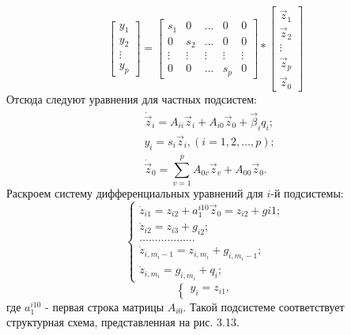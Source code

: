 \begin{equation}
	\begin{bmatrix}
	y_1 \\ y_2 \\ \vdots \\ y_p
	\end{bmatrix}=
	\begin{bmatrix}
	s_1 & 0 & \dots & 0 & 0\\
	0 & s_2 & \dots & 0 & 0\\
	\vdots & \vdots & \vdots & \vdots & \vdots\\
	0 & 0 & \dots & s_p & 0
	\end{bmatrix}*
	\begin{bmatrix}
	\vec{z}_1 \\ \vec{z}_2 \\ \vdots \\ \vec{z}_p \\ \vec{z}_0   
	\end{bmatrix}
\end{equation}
Отсюда следуют уравнения для частных подсистем:
\begin{gather}
\begin{split}
	&\dot{\vec{z}}_i=A_{ii}\vec{z}_i+A_{i0}\vec{z}_0+\vec{\beta}_iq_i;\\
	&y_i=s_i\vec{z}_i, (i=1,2,\dots,p);
\end{split}
\end{gather}
\begin{equation}
\dot{\vec{z}}_0=\sum_{v=1}^{p}A_{0v}\vec{z}_v+A_{00}\vec{z}_0.
\end{equation}
Раскроем систему дифференциальных уравнений для $i$-й подсистемы:
\begin{equation}
\begin{cases}
\dot{z}_{i1}=z_{i2}+a_1^{i10}\vec{z}_0=z_{i2}+g{i1};\\
\dot{z}_{i2}=z_{i3}+g_{i2};\\
\dots\dots\dots\dots\dots\dots\\
\dot{z}_{i,m_i-1}=z_{i,m_i}+g_{i,m_i-1};\\
\dot{z}_{i,m_i}=g_{i,m_i}+q_i;
\end{cases}
\end{equation}
\begin{equation*}
\begin{cases}
y_i=z_{i1},
\end{cases}
\end{equation*}
где $a_1^{i10}$ - первая строка матрицы $A_{i0}$. Такой подсистеме соответствует структурная схема, представленная на рис. 3.13.
